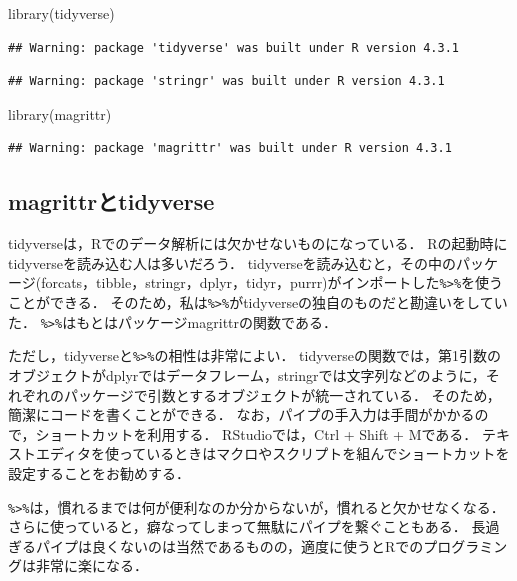 \documentclass[
]{article}
\newenvironment{Shaded}{\begin{snugshade}}{\end{snugshade}}
\newcommand{\FunctionTok}[1]{\textcolor[rgb]{0.00,0.00,0.00}{#1}}
\newcommand{\NormalTok}[1]{#1}
\begin{document}
\begin{Shaded}
\begin{Highlighting}[]
\FunctionTok{library}\NormalTok{(tidyverse)}
\end{Highlighting}
\end{Shaded}

\begin{verbatim}
## Warning: package 'tidyverse' was built under R version 4.3.1
\end{verbatim}

\begin{verbatim}
## Warning: package 'stringr' was built under R version 4.3.1
\end{verbatim}

\begin{Shaded}
\begin{Highlighting}[]
\FunctionTok{library}\NormalTok{(magrittr)}
\end{Highlighting}
\end{Shaded}

\begin{verbatim}
## Warning: package 'magrittr' was built under R version 4.3.1
\end{verbatim}

\hypertarget{magrittrux3068tidyverse}{%
\subsection{magrittrとtidyverse}\label{magrittrux3068tidyverse}}

tidyverseは，Rでのデータ解析には欠かせないものになっている．
Rの起動時にtidyverseを読み込む人は多いだろう．
tidyverseを読み込むと，その中のパッケージ(forcats，tibble，stringr，dplyr，tidyr，purrr)がインポートした\texttt{\%\textgreater{}\%}を使うことができる．
そのため，私は\texttt{\%\textgreater{}\%}がtidyverseの独自のものだと勘違いをしていた．
\texttt{\%\textgreater{}\%}はもとはパッケージmagrittrの関数である．

ただし，tidyverseと\texttt{\%\textgreater{}\%}の相性は非常によい．
tidyverseの関数では，第1引数のオブジェクトがdplyrではデータフレーム，stringrでは文字列などのように，それぞれのパッケージで引数とするオブジェクトが統一されている．
そのため，簡潔にコードを書くことができる．
なお，パイプの手入力は手間がかかるので，ショートカットを利用する．
RStudioでは，Ctrl + Shift + Mである．
テキストエディタを使っているときはマクロやスクリプトを組んでショートカットを設定することをお勧めする．

\texttt{\%\textgreater{}\%}は，慣れるまでは何が便利なのか分からないが，慣れると欠かせなくなる．
さらに使っていると，癖なってしまって無駄にパイプを繋ぐこともある．
長過ぎるパイプは良くないのは当然であるものの，適度に使うとRでのプログラミングは非常に楽になる．
\end{document}
